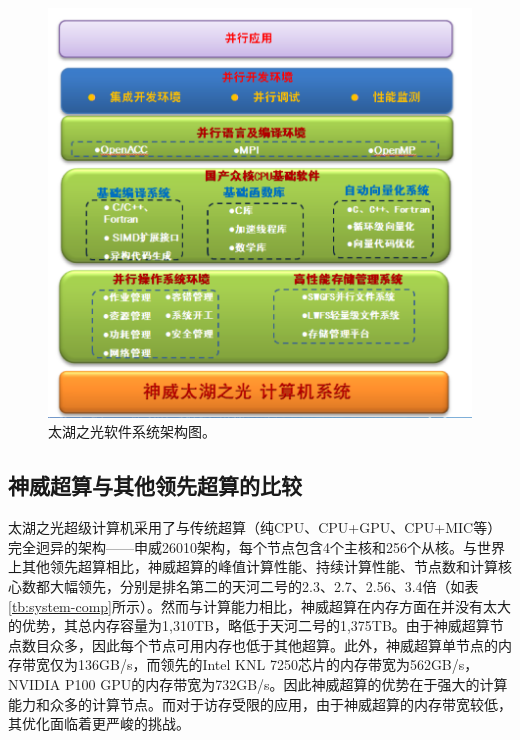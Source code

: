 \documentclass[degree=doctor]{thuthesis}
\begin{document}
\begin{figure}[ht]
\centering
\includegraphics[width=.8\columnwidth]{sunwaysofts.png}
\caption{太湖之光软件系统架构图。}
\label{fig:sunwaysofts}
\end{figure}

\subsection{神威超算与其他领先超算的比较}

太湖之光超级计算机采用了与传统超算（纯CPU、CPU+GPU、CPU+MIC等）完全迥异的架构——申威26010架构，每个节点包含4个主核和256个从核。与世界上其他领先超算相比，神威超算的峰值计算性能、持续计算性能、节点数和计算核心数都大幅领先，分别是排名第二的天河二号的2.3、2.7、2.56、3.4倍（如表\ref{tb:system-comp}所示）。然而与计算能力相比，神威超算在内存方面在并没有太大的优势，其总内存容量为1,310TB，略低于天河二号的1,375TB。由于神威超算节点数目众多，因此每个节点可用内存也低于其他超算。此外，神威超算单节点的内存带宽仅为136GB/s，而领先的Intel KNL 7250芯片的内存带宽为562GB/s，NVIDIA P100 GPU的内存带宽为732GB/s。因此神威超算的优势在于强大的计算能力和众多的计算节点。而对于访存受限的应用，由于神威超算的内存带宽较低，其优化面临着更严峻的挑战。
\end{document}
